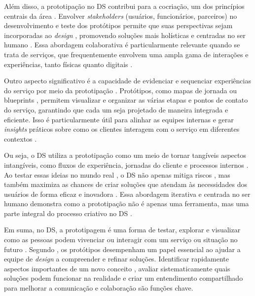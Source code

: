 Além disso, a prototipação no DS contribui para a cocriação, um dos princípios centrais da área \cite{Stickdorn2019}. Envolver \textit{stakeholders} (usuários, funcionários, parceiros) no desenvolvimento e teste dos protótipos permite que suas perspectivas sejam incorporadas ao \textit{design} \cite{asbjornsen2022echange, kumar2023rheumatology, milton2021eatingdisorders}, promovendo soluções mais holísticas e centradas no ser humano \cite{mager2023product}. Essa abordagem colaborativa é particularmente relevante quando se trata de serviços, que frequentemente envolvem uma ampla gama de interações e experiências, tanto físicas quanto digitais \cite{quintero2021interdisciplinary, seko2024transitions}.

Outro aspecto significativo é a capacidade de evidenciar e sequenciar experiências do serviço por meio da prototipação \cite{iriarte2023service}. Protótipos, como mapas de jornada ou blueprints \cite{Rosenbaum2017How, milton2021eatingdisorders}, permitem visualizar e organizar as várias etapas e pontos de contato do serviço, garantindo que cada um seja projetado de maneira integrada e eficiente. Isso é particularmente útil para alinhar as equipes internas e gerar \textit{insights} práticos sobre como os clientes interagem com o serviço em diferentes contextos \cite{paust2025integrative}.

Ou seja, o DS utiliza a prototipação como um meio de tornar tangíveis aspectos intangíveis, como fluxos de experiência, jornadas do cliente e processos internos \cite{soto2023prototyping, Blomkvist2014}. Ao testar essas ideias no mundo real \cite{Stickdorn2019}, o DS não apenas mitiga riscos \cite{mager2023product}, mas também maximiza as chances de criar soluções que atendam às necessidades dos usuários de forma eficaz e inovadora \cite{paust2025integrative}. Essa abordagem iterativa e centrada no ser humano demonstra como a prototipação não é apenas uma ferramenta, mas uma parte integral do processo criativo no DS \cite{kumar2023rheumatology}.

Em suma, no DS, a prototipagem é uma forma de testar, explorar e visualizar como as pessoas podem vivenciar ou interagir com um serviço ou situação no futuro \cite{soto2023prototyping, BuchenauSuri2000Experience}. Segundo , os protótipos desempenham um papel essencial ao ajudar a equipe de \textit{design} a compreender e refinar soluções. Identificar rapidamente aspectos importantes de um novo conceito \cite{paust2025integrative}, avaliar sistematicamente quais soluções podem funcionar na realidade \cite{paust2025integrative} e criar um entendimento compartilhado para melhorar a comunicação e colaboração \cite{paust2025integrative, mager2023product} são funções chave.

